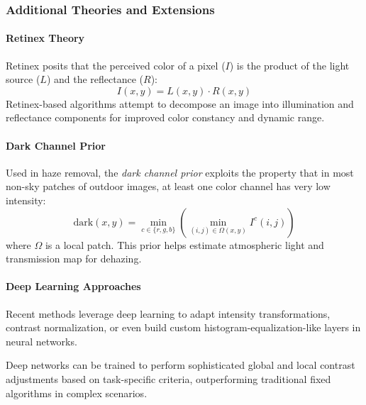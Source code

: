 
\subsubsection{Additional Theories and Extensions}

\paragraph{Retinex Theory}
Retinex posits that the perceived color of a pixel ($I$) is the product of the light source ($L$) and the reflectance ($R$):
$$
I(x, y) = L(x, y) \cdot R(x, y)
$$
Retinex-based algorithms attempt to decompose an image into illumination and reflectance components for improved color constancy and dynamic range.

\paragraph{Dark Channel Prior}
Used in haze removal, the \emph{dark channel prior} exploits the property that in most non-sky patches of outdoor images, at least one color channel has very low intensity:
$$
\text{dark}(x, y) = \min_{c \in \{r,g,b\}} \left( \min_{(i, j) \in \Omega(x, y)} I^c(i,j) \right)
$$
where $\Omega$ is a local patch. This prior helps estimate atmospheric light and transmission map for dehazing.


\paragraph{Deep Learning Approaches}

Recent methods leverage deep learning to adapt intensity transformations, contrast normalization, or even build custom histogram-equalization-like layers in neural networks\cite{szeliski2010,govindjee2007,bovik2019,gonzalez2008}.

Deep networks can be trained to perform sophisticated global and local contrast adjustments based on task-specific criteria, outperforming traditional fixed algorithms in complex scenarios.
